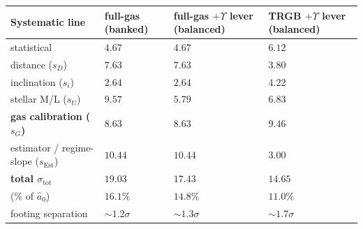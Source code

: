 \documentclass[
]{article}
\newcounter{none} %
\begin{document}
{\def\LTcaptype{none} %
\begin{longtable}[]{@{}
  >{\raggedright\arraybackslash}p{}
  >{\raggedright\arraybackslash}p{}
  >{\raggedright\arraybackslash}p{}
  >{\raggedright\arraybackslash}p{}@{}}
\toprule\noalign{}
\begin{minipage}[b]{\linewidth}\raggedright
Systematic line
\end{minipage} & \begin{minipage}[b]{\linewidth}\raggedright
full-gas (banked)
\end{minipage} & \begin{minipage}[b]{\linewidth}\raggedright
full-gas \(+\Upsilon\) lever (balanced)
\end{minipage} & \begin{minipage}[b]{\linewidth}\raggedright
TRGB \(+\Upsilon\) lever (balanced)
\end{minipage} \\
\midrule\noalign{}
\endhead
\bottomrule\noalign{}
\endlastfoot
statistical & \(4.67\) & \(4.67\) & \(6.12\) \\
distance (\(s_D\)) & \(7.63\) & \(7.63\) & \(3.80\) \\
inclination (\(s_i\)) & \(2.64\) & \(2.64\) & \(4.22\) \\
stellar M/L (\(s_U\)) & \(9.57\) & \(5.79\) & \(6.83\) \\
\textbf{gas calibration (\(s_G\))} & \(\mathbf{8.63}\) &
\(\mathbf{8.63}\) & \(\mathbf{9.46}\) \\
estimator / regime-slope (\(s_\mathrm{Est}\)) & \(10.44\) & \(10.44\) &
\(3.00\) \\
\textbf{total \(\sigma_\mathrm{tot}\)} & \(19.03\) & \(17.43\) &
\(14.65\) \\
(\(\%\) of \(\hat a_0\)) & \(16.1\%\) & \(14.8\%\) & \(11.0\%\) \\
footing separation & \(\sim1.2\sigma\) & \(\sim1.3\sigma\) &
\(\sim1.7\sigma\) \\
\end{longtable}
}
\end{document}

